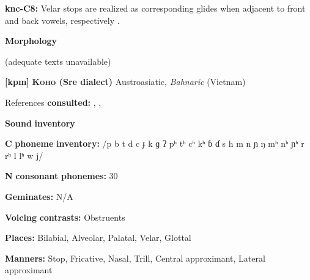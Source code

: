 \documentclass[output=paper]{langsci/langscibook}
\begin{document}
\begin{styleBody}
\textbf{knc-C8:} Velar stops are realized as corresponding glides when adjacent to front and back vowels, respectively \citep[22]{Cyffer1998}.
\end{styleBody}

\begin{styleBody}
\textbf{Morphology}
\end{styleBody}

\begin{styleBody}
(adequate texts unavailable)
\end{styleBody}

\begin{styleBody}
\textbf{[kpm]}   \textbf{\textsc{Koho} \textbf{(Sre} \textbf{dialect)}}  Austroasiatic, \textit{Bahnaric} (Vietnam)
\end{styleBody}

\begin{styleBody}
References \textbf{consulted:} \citet{LadefogedMaddieson1997}, \citet{Manley1972}, \citet{Olsen2014}
\end{styleBody}

\begin{styleBody}
\textbf{Sound} \textbf{inventory}
\end{styleBody}

\begin{styleBody}
\textbf{C} \textbf{phoneme} \textbf{inventory:} /p b t d c ɟ k ɡ ʔ pʰ tʰ cʰ kʰ ɓ ɗ s h m n ɲ ŋ mʰ nʰ ɲʰ r rʰ l lʰ w j/
\end{styleBody}

\begin{styleBody}
\textbf{N} \textbf{consonant} \textbf{phonemes:} 30
\end{styleBody}

\begin{styleBody}
\textbf{Geminates:} N/A
\end{styleBody}

\begin{styleBody}
\textbf{Voicing} \textbf{contrasts:} Obstruents
\end{styleBody}

\begin{styleBody}
\textbf{Places:} Bilabial, Alveolar, Palatal, Velar, Glottal
\end{styleBody}

\begin{styleBody}
\textbf{Manners:} Stop, Fricative, Nasal, Trill, Central approximant, Lateral approximant
\end{styleBody}
\end{document}
